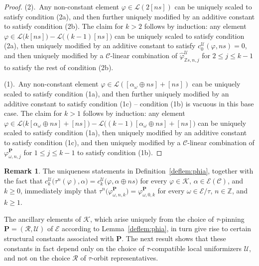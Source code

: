 \documentclass[preprint,12pt]{elsarticle}
\numberwithin{equation}{section} %
\theoremstyle{theorem}
\theoremstyle{definition}
\newtheorem{remark}[theorem]{Remark}
\newcommand{\Ca}{\mathcal{C}} %
\newcommand{\bk}{\mathcal{K}} %
\newcommand{\ec}{\mathcal{E}} %
\newcommand{\orbita}{{\ec/\tau}} %
\newcommand{\Z}{\mathbb{Z}} %
\begin{document}
\begin{proof}
   (2).~Any non-constant element $\varphi\in\mathcal{L}(2[ns])$ can be uniquely scaled to satisfy condition (2a), and then further uniquely modified by an additive constant to satisfy condition (2b). The claim for $k>2$ follows by induction: any element $\varphi\in\mathcal{L}\bigl(k[ns]\bigr)-\mathcal{L}\bigl((k-1)[ns]\bigr)$ can be uniquely scaled to satisfy condition (2a), then uniquely modified by an additive constant to satisfy $c_0^\mathcal{U}(\varphi,ns)=0$, and then uniquely modified by a $\Ca$-linear combination of $\hat{\varphi}^\mathcal{U}_{\Z s,n,j}$ for $2\leq j \leq k-1$ to satisfy the rest of condition (2b).

    (1).~Any non-constant element $\varphi\in\mathcal{L}([\alpha_\omega\oplus ns]+[ns])$ can be uniquely scaled to satisfy condition (1a), and then further uniquely modified by an additive constant to satisfy condition (1c) -- condition (1b) is vacuous in this base case. The claim for $k>1$ follows by induction: any element $\varphi\in\mathcal{L}\bigl(k[\alpha_\omega \oplus ns]+[ns]\bigr)-\mathcal{L}\bigl((k-1)[\alpha_\omega\oplus ns]+[ns]\bigr)$ can be uniquely scaled to satisfy condition (1a), then uniquely modified by an additive constant to satisfy condition (1c), and then uniquely modified by a $\Ca$-linear combination of $\varphi^\mathbf{P}_{\omega,n,j}$ for $1\leq j \leq k-1$ to satisfy condition (1b).
\end{proof}

\begin{remark}\label{rem:phia}
    The uniqueness statements in Definition~\ref{deflem:phia}, together with the fact that $c_k^\mathcal{U}\bigl(\tau^n(\varphi),\alpha\bigr)=c_k^\mathcal{U}(\varphi,\alpha\oplus ns\bigr)$ for every $\varphi\in\bk$, $\alpha\in\ec(\Ca)$, and $k\geq 0$, immediately imply that $\tau^n\bigl(\varphi^\mathbf{P}_{\omega,n,k}\bigr)=\varphi^\mathbf{P}_{\omega,0,k}$ for every $\omega\in\orbita$, $n\in \Z$, and $k\geq 1$.
\end{remark}

The ancillary elements of $\bk$, which arise uniquely from the choice of \mbox{$\tau$-pinning} $\mathbf{P}=(\mathcal{R},\mathcal{U})$ of $\mathcal{E}$ according to Lemma~\ref{deflem:phia}, in turn give rise to certain structural constants associated with $\mathbf{P}$. The next result shows that these constants in fact depend only on the choice of $\tau$-compatible local uniformizers $\mathcal{U}$, and not on the choice $\mathcal{R}$ of $\tau$-orbit representatives.
\end{document}
